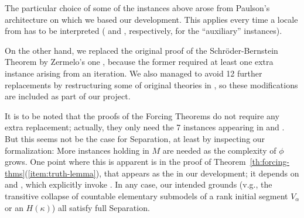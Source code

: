 The particular choice of some of the instances above arose from
Paulson's architecture on which we based our development.
This applies every time
a locale from  has to be
interpreted ( and
, respectively, for the “auxiliary” instances).

On the other hand, we replaced the original proof of the
Schröder-Bernstein Theorem by Zermelo's one
\cite[Exr. x4.27]{moschovakis1994notes}, because the former required
at least one extra instance
arising from an iteration. We also managed to avoid 12 further
replacements by restructuring some of original theories in
, so these modifications are included as
part of our project.

It is to be noted that the proofs of the Forcing Theorems do not
require any extra replacement; actually, they only need the 7
instances appearing in  and
.  But this seems not be
the case for Separation, at least by inspecting our formalization:
More instances holding in $M$ are needed 
as the complexity of $\phi$ grows. One point where this is apparent is
in the proof of Theorem~\ref{th:forcing-thms}(\ref{item:truth-lemma}),
that appears as the  in our development; it
depends on  and
, which explicitly invoke
. In any case, our intended grounds
(v.g., the transitive collapse of countable elementary submodels of a
rank initial segment $V_\alpha$ or an $H(\kappa)$) all satisfy full
Separation.


